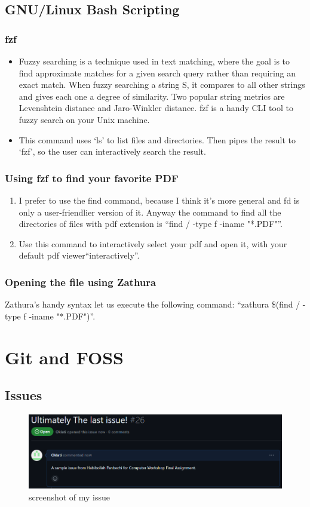 \documentclass[12pt]{article}
\begin{document}
\subsection{GNU/Linux Bash Scripting}
\subsubsection{fzf}
\begin{itemize}
    \item Fuzzy searching is a technique used in text matching, where the goal is to find approximate matches for a given search query rather than requiring an exact match. When fuzzy searching a string S, it compares to all other strings and gives each one a degree of similarity. Two popular string metrics are Levenshtein distance and Jaro-Winkler distance. fzf is a handy CLI tool to fuzzy search on your Unix machine.
    \item This command uses `ls' to list files and directories. Then pipes the result to `fzf', so the user can interactively search the result.
\end{itemize}

\subsubsection{Using fzf to find your favorite PDF}
\begin{enumerate}
    \item I prefer to use the find command, because I think it's more general and fd is only a user-friendlier version of it. Anyway the command to find all the directories of files with pdf extension is ``find / -type f -iname "*.PDF"''.
    \item Use this command to interactively select your pdf and open it, with your default pdf viewer``interactively''.
\end{enumerate}

\subsubsection{Opening the file using Zathura}
Zathura's handy syntax let us execute the following command: \newline``zathura \$(find / -type f -iname "*.PDF")''.

\newpage

\section{Git and FOSS}
\subsection{Issues}

\begin{figure}[!h]
    \centering
    \includegraphics[width=1\textwidth]{Screenshot 2024-01-27 225143.png}
    \caption{screenshot of my issue}
\end{figure}
\end{document}
